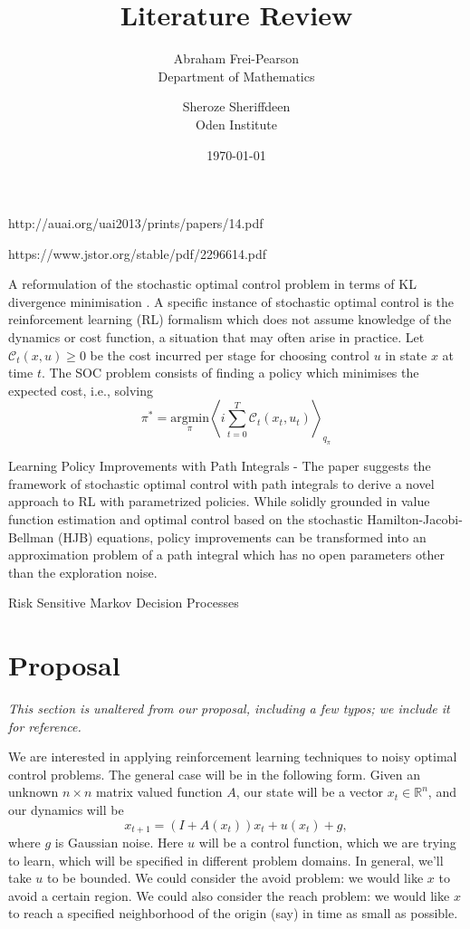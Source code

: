 \documentclass{article}
\title{Literature Review}
\author{Abraham Frei-Pearson \\
	Department of Mathematics  \\
	\and 
	Sheroze Sheriffdeen \\
	Oden Institute \\
	}
\date{\today}
\begin{document}
\maketitle

http://auai.org/uai2013/prints/papers/14.pdf

https://www.jstor.org/stable/pdf/2296614.pdf

A reformulation of the stochastic optimal control problem in terms of KL divergence minimisation \cite{rawlik2013stochastic}.  A specific instance of stochastic optimal control is the reinforcement learning (RL) formalism  which does not assume knowledge of the dynamics or cost function, a situation that may often arise in practice.  Let $\mathcal{C}_t(x, u) \ge 0$ be the cost incurred per stage for choosing control $u$ in state $x$ at time $t$. The SOC problem consists of finding a policy which minimises the expected cost, i.e., solving
\begin{equation}
    \pi^* = \underset{\pi}{\mathrm{argmin}} \left \langle i  \sum_{t=0}^T \mathcal{C}_t (x_t, u_t) \right \rangle_{q_{\pi}}
\end{equation}

Learning Policy Improvements with Path Integrals \cite{theodorou2010learning} - The paper suggests the framework of stochastic optimal control with path integrals to derive a novel approach to RL with parametrized policies. While solidly grounded in value function estimation and optimal control based on the stochastic Hamilton-Jacobi-Bellman (HJB) equations, policy improvements can be transformed into an approximation problem of a path integral which has no open parameters other than the exploration noise.

Risk Sensitive Markov Decision Processes \cite{marcus1997risk}

\section{Proposal}

{\em This section is unaltered from our proposal, including a few typos; we include it for reference.}

We are interested in applying reinforcement learning techniques to noisy optimal control problems. The general case will be in the following form. Given an unknown $n \times n$ matrix valued function $A$, our state will be a vector $x_t \in \mathbb R^n$, and our dynamics will be
\[
    x_{t+1} = (I + A(x_t)) x_t + u(x_t) + g,
\]
where $g$ is Gaussian noise. Here $u$ will be a control function, which we are trying to learn, which will be specified in different problem domains. In general, we'll take $u$ to be bounded. We could consider the avoid problem: we would like $x$ to avoid a certain region. We could also consider the reach problem: we would like $x$ to reach a specified neighborhood of the origin (say) in time as small as possible.
\end{document}
